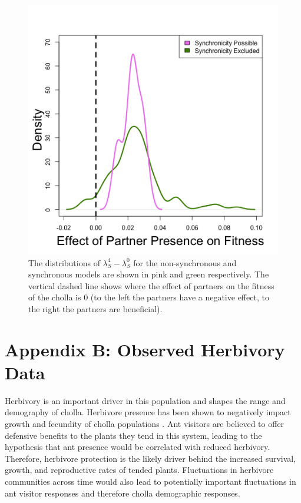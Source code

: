 \documentclass[11pt]{article}
\begin{document}
\renewcommand{\thefigure}{A\arabic{figure}}

\begin{figure}[H]
	\includegraphics[width=\linewidth]{Figures/portfolio_effect.png}
	\caption{The distributions of $\lambda_{S}^4-\lambda_{S}^0$ for the non-synchronous and synchronous models are shown in pink and green respectively. The vertical dashed line shows where the effect of partners on the fitness of the cholla is 0 (to the left the partners have a negative effect, to the right the partners are beneficial).}
	\label{fig:Portfolio}
\end{figure}

\section*{Appendix B: Observed Herbivory Data} \label{appendix:B}
Herbivory is an important driver in this population and shapes the range and demography of cholla.
Herbivore presence has been shown to negatively impact growth and fecundity of cholla populations \citep{Miller2009}.
Ant visitors are believed to offer defensive benefits to the plants they tend in this system, leading to the hypothesis that ant presence would be correlated with reduced herbivory.
Therefore, herbivore protection is the likely driver behind the increased survival, growth, and reproductive rates of tended plants. 
Fluctuations in herbivore communities across time would also lead to potentially important fluctuations in ant visitor responses and therefore cholla demographic responses.
\end{document}

